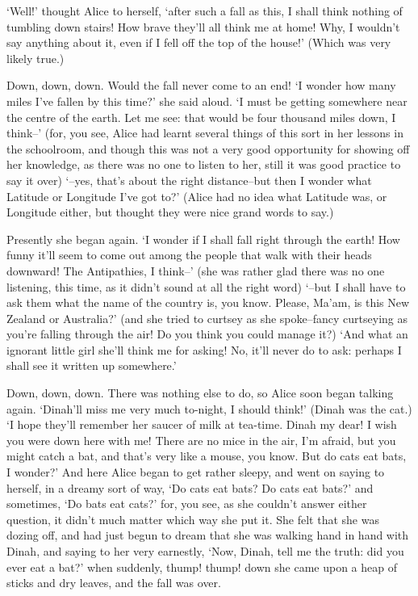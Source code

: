 \documentclass[
    11pt,
    a4paper
]{article}
\begin{document}
`Well!' thought Alice to herself, `after such a fall as this, I shall
think nothing of tumbling down stairs! How brave they'll all think me at
home! Why, I wouldn't say anything about it, even if I fell off the top
of the house!' (Which was very likely true.)

Down, down, down. Would the fall {never} come to an end! `I wonder how
many miles I've fallen by this time?' she said aloud. `I must be getting
somewhere near the centre of the earth. Let me see: that would be four
thousand miles down, I think--' (for, you see, Alice had learnt several
things of this sort in her lessons in the schoolroom, and though this
was not a {very} good opportunity for showing off her knowledge, as there
was no one to listen to her, still it was good practice to say it over)
`--yes, that's about the right distance--but then I wonder what Latitude
or Longitude I've got to?' (Alice had no idea what Latitude was, or
Longitude either, but thought they were nice grand words to say.)

Presently she began again. `I wonder if I shall fall right {through} the
earth! How funny it'll seem to come out among the people that walk with
their heads downward! The Antipathies, I think--' (she was rather glad
there {was} no one listening, this time, as it didn't sound at all the
right word) `--but I shall have to ask them what the name of the country
is, you know. Please, Ma'am, is this New Zealand or Australia?' (and
she tried to curtsey as she spoke--fancy {curtseying} as you're falling
through the air! Do you think you could manage it?) `And what an
ignorant little girl she'll think me for asking! No, it'll never do to
ask: perhaps I shall see it written up somewhere.'

Down, down, down. There was nothing else to do, so Alice soon began
talking again. `Dinah'll miss me very much to-night, I should think!'
(Dinah was the cat.) `I hope they'll remember her saucer of milk at
tea-time. Dinah my dear! I wish you were down here with me! There are no
mice in the air, I'm afraid, but you might catch a bat, and that's very
like a mouse, you know. But do cats eat bats, I wonder?' And here Alice
began to get rather sleepy, and went on saying to herself, in a dreamy
sort of way, `Do cats eat bats? Do cats eat bats?' and sometimes, `Do
bats eat cats?' for, you see, as she couldn't answer either question,
it didn't much matter which way she put it. She felt that she was dozing
off, and had just begun to dream that she was walking hand in hand with
Dinah, and saying to her very earnestly, `Now, Dinah, tell me the truth:
did you ever eat a bat?' when suddenly, thump! thump! down she came upon
a heap of sticks and dry leaves, and the fall was over.
\end{document}
